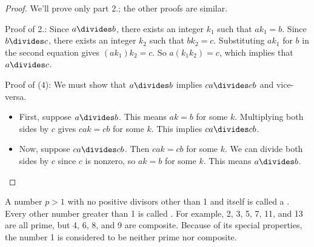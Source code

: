 \begin{proof}
We'll prove only part 2.; the other proofs are similar.

Proof of 2.: Since $a \divides b$, there exists an integer $k_1$ such
that $a k_1 = b$.  Since $b \divides c$, there exists an integer $k_2$
such that $b k_2=c$.  Substituting $a k_1$ for $b$ in the second
equation gives $(a k_1) k_2 = c$.  So $ a (k_1 k_2) = c$, which
implies that $a \divides c$.

\begin{editingnotes}

Proof of (4): We must show that $a \divides b$ implies $ca \divides cb$ and
vice-versa.
%
\begin{itemize}
\item First, suppose $a \divides b$.  This means $a k = b$ for some $k$.
Multiplying both sides by $c$ gives $c a k = c b$ for some $k$.  This
implies $ca \divides cb$.
\item Now, suppose $ca \divides cb$.  Then $c a k = c b$ for some $k$.
We can divide both sides by $c$ since $c$ is nonzero, so $a k = b$ for
some $k$.  This means $a \divides b$.
\end{itemize}

\end{editingnotes}
\end{proof}

A number $p > 1$ with no positive divisors other than 1 and itself is
called a .  Every other number greater than 1 is called
.  For example, 2, 3, 5, 7, 11, and 13 are all prime,
but 4, 6, 8, and 9 are composite.  Because of its special properties,
the number 1 is considered to be neither prime nor composite.

